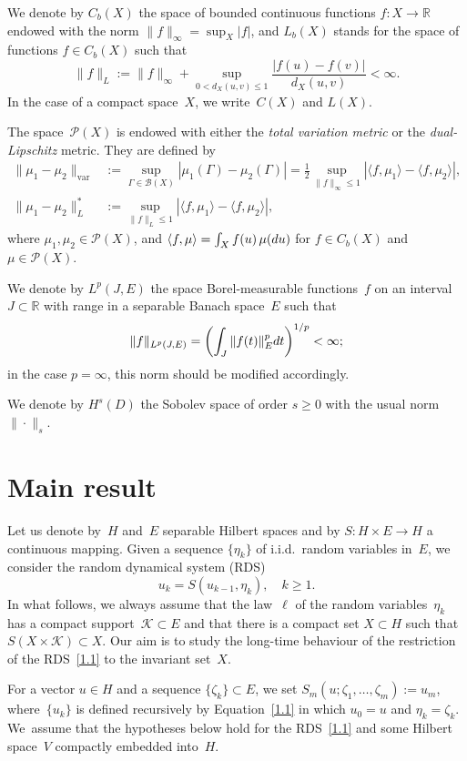 \documentclass[11pt]{article}
\theoremstyle{plain}
\theoremstyle{definition}
\let\mathcal\mathscr
\theoremstyle{plain}
\numberwithin{equation}{section}
\let\lag\langle
\let\rag\rangle
\newcommand{\dd}{{\textup d}}
\newcommand{\R}{{\mathbb R}}
\newcommand{\BB}{{\mathcal B}}
\newcommand{\KK}{{\mathcal K}}
\newcommand{\PP}{{\mathcal P}}
\begin{document}
We denote by $C_b(X)$ the space of bounded continuous functions $f:X\to\R$ endowed with the norm $\|f\|_\infty=\sup_X|f|$, and $L_b(X)$ stands for the space of functions $f\in C_b(X)$ such that
\[
\|f\|_L:=\|f\|_\infty+\sup_{0<d_X(u,v)\le 1}\frac{|f(u)-f(v)|}{d_X(u,v)}<\infty.
\]
In the case of a compact space~$X$, we write~$C(X)$ and $L(X)$.

The space~$\PP(X)$ is endowed with either the \emph{total variation metric} or the \emph{dual-Lipschitz} metric. They are defined by
\begin{align}
\|\mu_1-\mu_2\|_{\mathrm{var}}&:=\sup_{\Gamma\in\BB(X)}|\mu_1(\Gamma)-\mu_2(\Gamma)|
=\frac12\sup_{\|f\|_\infty\le1}
\left|\lag f,\mu_1\rag-\lag f,\mu_2\rag\right|, \label{TVN}\\
\|\mu_1-\mu_2\|_L^*
&:=\sup_{\|f\|_L\le1}\left|\lag f,\mu_1\rag-\lag f,\mu_2\rag\right|, \label{dL}
\end{align}
where $\mu_1, \mu_2\in \PP(X)$, and $\lag f,\mu\rag = \int_X f(u) \,\mu(\dd u)$ for $f\in C_b(X)$ and $\mu\in \PP(X)$.

We denote by $L^p(J,E)$ the space Borel-measurable functions~$f$ on an interval $J\subset\R$ with range in a separable Banach space~$E$ such that
\[
\|f\|_{L^p(J,E)}=\biggl(\int_J \|f(t)\|_E^p\dd t\biggr)^{1/p}<\infty;
\]
in the case $p=\infty$, this norm should be modified accordingly.

We denote by $H^s(D)$ the Sobolev space of order $s\ge0$ with the usual norm~$\|\cdot\|_s$.

\section{Main result}
\label{s1}

Let us denote by~$H$ and~$E$ separable Hilbert spaces and by $S:H\times E\to H$ a continuous mapping. Given a sequence $\{\eta_k\}$ of i.i.d.\ random variables in~$E$, we consider the random dynamical system (RDS)
\begin{equation} \label{1.1}
u_k=S(u_{k-1},\eta_k), \quad k\ge1.
\end{equation}
In what follows, we always assume that the law~$\ell$ of the random variables~$\eta_k$ has a compact support~$\KK\subset E$ and that there is a compact set $X\subset H$ such that $S(X\times\KK)\subset X$. Our aim is to study the long-time behaviour of the restriction of the RDS~\eqref{1.1} to the invariant set~$X$.

For a vector $u\in H$ and a sequence $\{\zeta_k\}\subset E$, we set $S_m(u;\zeta_1,\dots,\zeta_m):=u_m$, where~$\{u_k\}$ is defined recursively by Equation~\eqref{1.1} in which $u_0=u$ and $\eta_k=\zeta_k$. We~assume that the hypotheses below hold for the RDS~\eqref{1.1} and some Hilbert space~$V$ compactly embedded into~$H$.
\end{document}
